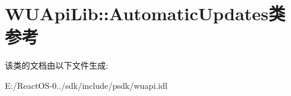 \hypertarget{class_w_u_api_lib_1_1_automatic_updates}{}\section{W\+U\+Api\+Lib\+:\+:Automatic\+Updates类 参考}
\label{class_w_u_api_lib_1_1_automatic_updates}


该类的文档由以下文件生成\+:\begin{DoxyCompactItemize}
\item 
E\+:/\+React\+O\+S-\/0../sdk/include/psdk/wuapi.\+idl\end{DoxyCompactItemize}
